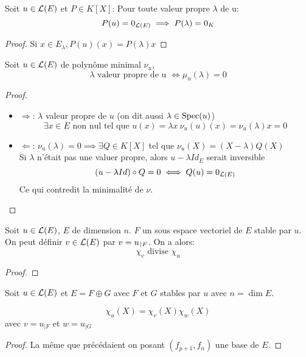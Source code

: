 \begin{prop}
	Soit $u \in \mathcal{L}(E)$ et $P \in K[X]$: Pour toute valeur propre $\lambda$ de u:
	$$ P(u) = 0_{\mathcal{L}(E)} \implies P(\lambda) = 0_K$$
\end{prop}

\begin{proof}
	Si $x \in E_\lambda , P(u)(x) = P(\lambda) x$ %
\end{proof}


\begin{prop}
	Soit $u \in \mathcal{L}(E)$ de polynôme minimal $\nu_u$,
	$$ \lambda \text{ valeur propre de u }\iff \mu_u(\lambda) = 0$$
\end{prop}


\begin{proof}
	\begin{itemize}
		\item  $\Rightarrow$:
		      $\lambda$ valeur propre de $u$ (on dit aussi $\lambda \in \text{Spec}(u)$)
		      $$\exists x \in E \text { non nul tel que } u(x) = \lambda x \ \nu_u(u)(x) = \nu_u(\lambda)x =0$$
		\item $\Leftarrow$:
		      $\nu_u(\lambda) = 0 \implies \exists Q \in K[X]$ tel que $\nu_u(X) = (X - \lambda)Q(X)$\\
		      Si $\lambda$ n'était pas une valuer propre, alors $u-\lambda Id_E$ serait inversible
		      $$ (u-  \lambda Id) \circ Q = 0 \iff Q(u) = 0_{\mathcal{L}(E)}$$
		      Ce qui contredit la minimalité de $\nu$.
	\end{itemize}
\end{proof}



\begin{prop}
	Soit $u \in \mathcal{L}(E)$, $E$ de dimension $n$.
	$F$ un sous espace vectoriel de $E$ stable par $u$.
	On peut définir $v \in \mathcal{L}(E)$ par $v = u_{\restriction F}$. On a alors:
	$$\chi_v \text{ divise } \chi_u$$
\end{prop}

\begin{proof}
\end{proof}

\begin{prop}
	Soit $u \in \mathcal{L}(E)$ et $E = F \oplus G$ avec $F$ et $G$ stables par $u$ avec $n = \dim E$.

	$$\chi_u (X)= \chi_v (X) \chi_w(X)$$
	avec $v = u_{|F}$ et $w = u_{|G}$
\end{prop}

\begin{proof}
	La même que précédaient on posant $(f_{p+1}, f_n)$ une base de $E$.
\end{proof}


